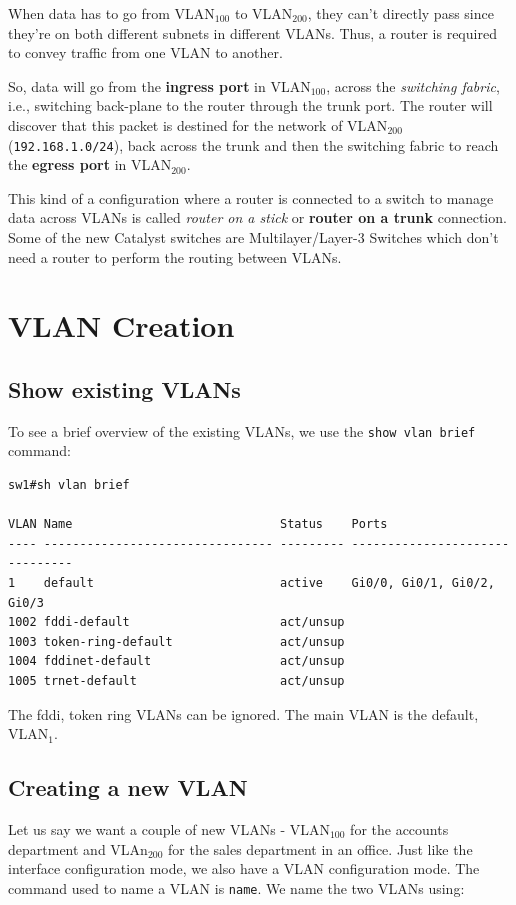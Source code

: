 \noindent
When data has to go from VLAN$_{100}$ to VLAN$_{200}$, they can't directly pass since they're on both different subnets in different VLANs. Thus, a router is required to convey traffic from one VLAN to another. 

So, data will go from the \textbf{ingress port} in VLAN$_{100}$, across the \textit{switching fabric}, i.e., switching back-plane to the router through the trunk port. The router will discover that this packet is destined for the network of VLAN$_{200}$ (\verb|192.168.1.0/24|), back across the trunk and then the switching fabric to reach the \textbf{egress port} in VLAN$_{200}$. 

This kind of a configuration where a router is connected to a switch to manage data across VLANs is called \textit{router on a stick} or \textbf{router on a trunk} connection. Some of the new Catalyst switches are Multilayer/Layer-3 Switches which don't need a router to perform the routing between VLANs. 

\section{VLAN Creation}
\subsection{Show existing VLANs}
To see a brief overview of the existing VLANs, we use the \verb|show vlan brief| command: 

\vspace{-15pt}
\begin{verbatim}
sw1#sh vlan brief

VLAN Name                             Status    Ports
---- -------------------------------- --------- -------------------------------
1    default                          active    Gi0/0, Gi0/1, Gi0/2, Gi0/3
1002 fddi-default                     act/unsup
1003 token-ring-default               act/unsup
1004 fddinet-default                  act/unsup
1005 trnet-default                    act/unsup
\end{verbatim}
\vspace{-10pt}

\noindent
The fddi, token ring VLANs can be ignored. The main VLAN is the default, VLAN$_1$. 

\subsection{Creating a new VLAN}
Let us say we want a couple of new VLANs - VLAN$_{100}$ for the accounts department and VLAn$_{200}$ for the sales department in an office. Just like the interface configuration mode, we also have a VLAN configuration mode. The command used to name a VLAN is \verb|name|. We name the two VLANs using:

